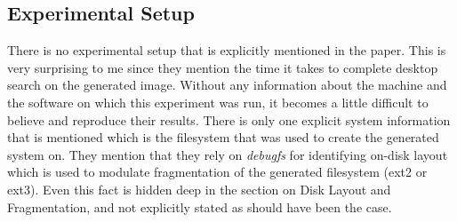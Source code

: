 \subsection{Experimental Setup} There is no experimental setup that is explicitly mentioned in the paper. This is very surprising to me since they mention the time it takes to complete desktop search on the generated image. Without any information about the machine and the software on which this experiment was run, it becomes a little difficult to believe and reproduce their results.
There is only one explicit system information that is mentioned which is the filesystem that was used to create the generated system on. They mention that they rely on \emph{debugfs} for identifying on-disk layout which is used to modulate fragmentation of the generated filesystem (ext2 or ext3). Even this fact is hidden deep in the section on Disk Layout and Fragmentation, and not explicitly stated as should have been the case. 

